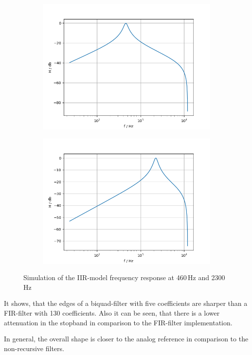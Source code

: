 \begin{figure}[!h]
    \centering
    \begin{subfigure}[c]{0.49\textwidth}
        \centering
        \includegraphics[width=\textwidth]{img/iir_bandpass460.png}
    \end{subfigure}
    \begin{subfigure}[c]{0.49\textwidth}
        \centering
        \includegraphics[width=\textwidth]{img/iir_bandpass2242.png}
    \end{subfigure}
    \caption{Simulation of the \ac{IIR}-model frequency response at 460\,Hz and 2300\,Hz}
    \label{fig:iir-biquad-sim}
\end{figure}

It shows, that the edges of a biquad-filter with five coefficients are sharper than a \ac{FIR}-filter
with 130 coefficients. Also it can be seen, that there is a lower attenuation in the stopband in comparison
to the \ac{FIR}-filter implementation.

In general, the overall shape is closer to the analog reference in comparison to
the non-recursive filters.
